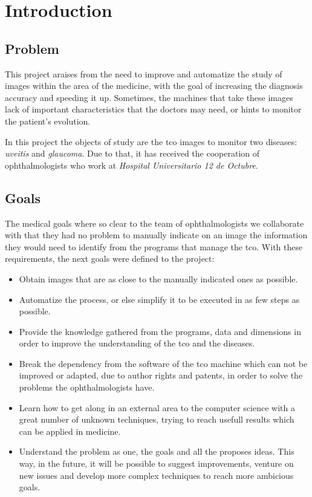 \chapter{Introduction}
\section{Problem}
This project araises from the need to improve and automatize the
study of images within the area of the medicine, with the goal of 
increasing the diagnosis accuracy and speeding it up. Sometimes, the
machines that take these images lack of important characteristics 
that the doctors may need, or hints to monitor the patient's evolution.

In this project the objects of study are the \gls{tco} images to monitor
two diseases: \emph{\gls{uveitis}} and \emph{\gls{glaucoma}}. Due to that,
it has received the cooperation of ophthalmologists who work at
\emph{Hospital Universitario 12 de Octubre}.

\section{Goals}
The medical goals where so clear to the team of ophthalmologists
we collaborate with that they had no problem to manually indicate on an
image the information they would need to identify from the programs that 
manage the \gls{tco}. With these requirements, the next goals were defined 
to the project:
\begin{itemize}
\item Obtain images that are as close to the manually indicated ones as possible.
\item Automatize the process, or else simplify it to be executed in as few steps as possible.
\item Provide the knowledge gathered from the programs, data and 
dimensions in order to improve the understanding of the \gls{tco} and
the diseases.
\item Break the dependency from the software of the \gls{tco} machine
which can not be improved or adapted, due to author rights and patents, 
in order to solve the problems the ophthalmologists have.
\item Learn how to get along in an external area to the computer science
with a great number of unknown techniques, trying to reach usefull 
results which can be applied in medicine.
\item Understand the problem as one, the goals and all the proposes ideas.
This way, in the future, it will be possible to suggest improvements, venture
on new issues and develop more complex techniques to reach more
ambicious goals.
\end{itemize}

